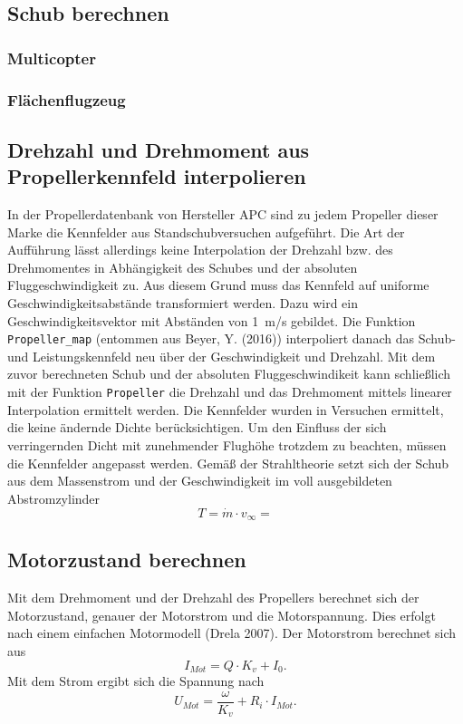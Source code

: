 \subsection{Schub berechnen}
\subsubsection{Multicopter}
\subsubsection{Flächenflugzeug}
\subsection{Drehzahl und Drehmoment aus Propellerkennfeld interpolieren}
In der Propellerdatenbank von Hersteller APC sind zu jedem Propeller dieser Marke die Kennfelder aus Standschubversuchen aufgeführt. Die Art der Aufführung lässt allerdings keine Interpolation der Drehzahl bzw. des Drehmomentes in Abhängigkeit des Schubes und der absoluten Fluggeschwindigkeit zu. Aus diesem Grund muss das Kennfeld auf uniforme Geschwindigkeitsabstände transformiert werden. Dazu wird ein Geschwindigkeitsvektor mit Abständen von \SI{1}{m/s} gebildet. Die Funktion \texttt{Propeller\_map} (entommen aus Beyer, Y. (2016)) interpoliert danach das Schub- und Leistungskennfeld neu über der Geschwindigkeit und Drehzahl. Mit dem zuvor berechneten Schub und der absoluten Fluggeschwindikeit kann schließlich mit der Funktion \texttt{Propeller} die Drehzahl und das Drehmoment mittels linearer Interpolation ermittelt werden.
Die Kennfelder wurden in Versuchen ermittelt, die keine ändernde Dichte berücksichtigen. Um den Einfluss der sich verringernden Dicht mit zunehmender Flughöhe trotzdem zu beachten, müssen die Kennfelder angepasst werden. Gemäß der Strahltheorie setzt sich der Schub aus dem Massenstrom und der Geschwindigkeit im voll ausgebildeten Abstromzylinder 
\begin{equation}
	T =  \dot{m}\cdot v_{\infty} = 
\end{equation}

\subsection{Motorzustand berechnen}
Mit dem Drehmoment und der Drehzahl des Propellers berechnet sich der Motorzustand, genauer der Motorstrom und die Motorspannung. Dies erfolgt nach einem einfachen Motormodell (Drela 2007).
Der Motorstrom berechnet sich aus 
\begin{equation}
	I_{Mot} = Q\cdot K_v + I_0.
\end{equation}
Mit dem Strom ergibt sich die Spannung nach
\begin{equation}
	U_{Mot} = \frac{\omega}{K_v} + R_i\cdot I_{Mot}.
\end{equation}
